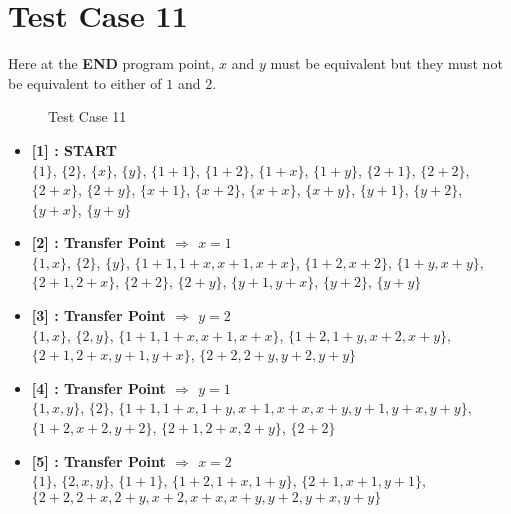 \section{Test Case 11}
\label{sec:tc11}
Here at the \textbf{END} program point, $x$ and $y$ must be equivalent but they 
must not be equivalent to either of $1$ and $2$.

\begin{figure}[H]
\label{fig:tc11}
    \caption{Test Case 11}
\end{figure}

\begin{itemize}

    \item \textbf{[1] : START}\\
        $\{1\}$, $\{2\}$, $\{x\}$, $\{y\}$, $\{1 + 1\}$, $\{1 + 2\}$, $\{1 + x\}$, $\{1 + y\}$, $\{2 + 1\}$, $\{2 + 2\}$, $\{2 + x\}$, $\{2 + y\}$, $\{x + 1\}$, $\{x + 2\}$, $\{x + x\}$, $\{x + y\}$, $\{y + 1\}$, $\{y + 2\}$, $\{y + x\}$, $\{y + y\}$

    \item \textbf{[2] : Transfer Point $\Rightarrow$ $x = 1$}\\
        $\{1, x\}$, $\{2\}$, $\{y\}$, $\{1 + 1, 1 + x, x + 1, x + x\}$, $\{1 + 2, x + 2\}$, $\{1 + y, x + y\}$, $\{2 + 1, 2 + x\}$, $\{2 + 2\}$, $\{2 + y\}$, $\{y + 1, y + x\}$, $\{y + 2\}$, $\{y + y\}$

    \item \textbf{[3] : Transfer Point $\Rightarrow$ $y = 2$}\\
        $\{1, x\}$, $\{2, y\}$, $\{1 + 1, 1 + x, x + 1, x + x\}$, $\{1 + 2, 1 + y, x + 2, x + y\}$, $\{2 + 1, 2 + x, y + 1, y + x\}$, $\{2 + 2, 2 + y, y + 2, y + y\}$

    \item \textbf{[4] : Transfer Point $\Rightarrow$ $y = 1$}\\
        $\{1, x, y\}$, $\{2\}$, $\{1 + 1, 1 + x, 1 + y, x + 1, x + x, x + y, y + 1, y + x, y + y\}$, $\{1 + 2, x + 2, y + 2\}$, $\{2 + 1, 2 + x, 2 + y\}$, $\{2 + 2\}$

    \item \textbf{[5] : Transfer Point $\Rightarrow$ $x = 2$}\\
        $\{1\}$, $\{2, x, y\}$, $\{1 + 1\}$, $\{1 + 2, 1 + x, 1 + y\}$, $\{2 + 1, x + 1, y + 1\}$, $\{2 + 2, 2 + x, 2 + y, x + 2, x + x, x + y, y + 2, y + x, y + y\}$


\end{itemize}
